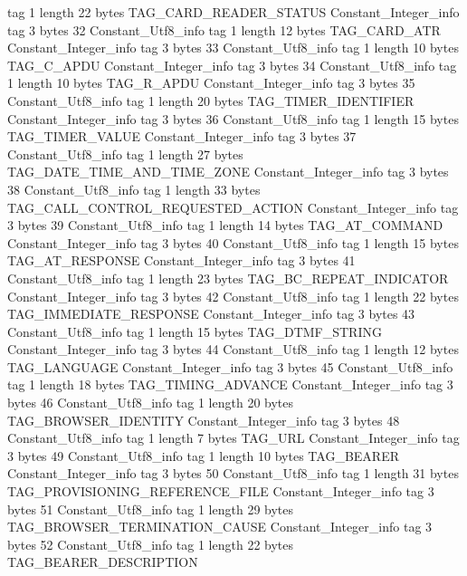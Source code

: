 {{{			tag	1
			length	22
			bytes	TAG_CARD_READER_STATUS
		}
		Constant_Integer_info {
			tag	3
			bytes	32
		}
		Constant_Utf8_info {
			tag	1
			length	12
			bytes	TAG_CARD_ATR
		}
		Constant_Integer_info {
			tag	3
			bytes	33
		}
		Constant_Utf8_info {
			tag	1
			length	10
			bytes	TAG_C_APDU
		}
		Constant_Integer_info {
			tag	3
			bytes	34
		}
		Constant_Utf8_info {
			tag	1
			length	10
			bytes	TAG_R_APDU
		}
		Constant_Integer_info {
			tag	3
			bytes	35
		}
		Constant_Utf8_info {
			tag	1
			length	20
			bytes	TAG_TIMER_IDENTIFIER
		}
		Constant_Integer_info {
			tag	3
			bytes	36
		}
		Constant_Utf8_info {
			tag	1
			length	15
			bytes	TAG_TIMER_VALUE
		}
		Constant_Integer_info {
			tag	3
			bytes	37
		}
		Constant_Utf8_info {
			tag	1
			length	27
			bytes	TAG_DATE_TIME_AND_TIME_ZONE
		}
		Constant_Integer_info {
			tag	3
			bytes	38
		}
		Constant_Utf8_info {
			tag	1
			length	33
			bytes	TAG_CALL_CONTROL_REQUESTED_ACTION
		}
		Constant_Integer_info {
			tag	3
			bytes	39
		}
		Constant_Utf8_info {
			tag	1
			length	14
			bytes	TAG_AT_COMMAND
		}
		Constant_Integer_info {
			tag	3
			bytes	40
		}
		Constant_Utf8_info {
			tag	1
			length	15
			bytes	TAG_AT_RESPONSE
		}
		Constant_Integer_info {
			tag	3
			bytes	41
		}
		Constant_Utf8_info {
			tag	1
			length	23
			bytes	TAG_BC_REPEAT_INDICATOR
		}
		Constant_Integer_info {
			tag	3
			bytes	42
		}
		Constant_Utf8_info {
			tag	1
			length	22
			bytes	TAG_IMMEDIATE_RESPONSE
		}
		Constant_Integer_info {
			tag	3
			bytes	43
		}
		Constant_Utf8_info {
			tag	1
			length	15
			bytes	TAG_DTMF_STRING
		}
		Constant_Integer_info {
			tag	3
			bytes	44
		}
		Constant_Utf8_info {
			tag	1
			length	12
			bytes	TAG_LANGUAGE
		}
		Constant_Integer_info {
			tag	3
			bytes	45
		}
		Constant_Utf8_info {
			tag	1
			length	18
			bytes	TAG_TIMING_ADVANCE
		}
		Constant_Integer_info {
			tag	3
			bytes	46
		}
		Constant_Utf8_info {
			tag	1
			length	20
			bytes	TAG_BROWSER_IDENTITY
		}
		Constant_Integer_info {
			tag	3
			bytes	48
		}
		Constant_Utf8_info {
			tag	1
			length	7
			bytes	TAG_URL
		}
		Constant_Integer_info {
			tag	3
			bytes	49
		}
		Constant_Utf8_info {
			tag	1
			length	10
			bytes	TAG_BEARER
		}
		Constant_Integer_info {
			tag	3
			bytes	50
		}
		Constant_Utf8_info {
			tag	1
			length	31
			bytes	TAG_PROVISIONING_REFERENCE_FILE
		}
		Constant_Integer_info {
			tag	3
			bytes	51
		}
		Constant_Utf8_info {
			tag	1
			length	29
			bytes	TAG_BROWSER_TERMINATION_CAUSE
		}
		Constant_Integer_info {
			tag	3
			bytes	52
		}
		Constant_Utf8_info {
			tag	1
			length	22
			bytes	TAG_BEARER_DESCRIPTION
}}}
